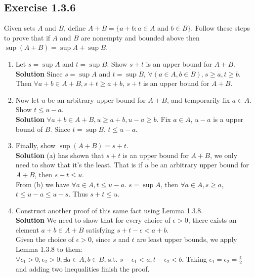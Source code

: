 \documentclass[12pt]{report}
\begin{document}
\subsection*{Exercise 1.3.6}
Given sets $A$ and $B$, define $A+B=\{a+b: a \in A$ and $b \in B\}$. Follow these steps to prove that if $A$ and $B$ are nonempty and bounded above then $\sup (A+B)=\sup A+\sup B$.
\begin{enumerate}[label=(\alph*)]
    \item Let $s=\sup A$ and $t=\sup B$. Show $s+t$ is an upper bound for $A+B$.
    \textbf{Solution} Since $s=\sup A$ and $t=\sup B$, $\forall (a \in A, b \in B), s \geq a, t \geq b$. Then $\forall a+b \in A+B, s+t \geq a+b$, $s+t$ is an upper bound for $A+B$.
    \item Now let $u$ be an arbitrary upper bound for $A+B$, and temporarily fix $a \in A$. Show $t \leq u-a$.\\
    \textbf{Solution} $\forall a+b \in A+B, u \geq a+b, u-a \geq b$. Fix $a\in A$, $u-a$ is a upper bound of $B$. Since $t=\sup B$, $t \leq u-a$.
    \item Finally, show $\sup (A+B)=s+t$.\\
    \textbf{Solution} (a) has shown that $s+t$ is an upper bound for $A+B$, we only need to show that it's the least. That is if $u$ be an arbitrary upper bound for $A+B$, then $s+t \leq u$.\\
    From (b) we have $\forall a \in A, t\leq u-a$. $s = \sup A$, then $\forall a\in A, s \geq a$, $t\leq u-a\leq u-s$. Thus $s+t \leq u$.
    \item Construct another proof of this same fact using Lemma 1.3.8.\\
    \textbf{Solution} We need to show that for every choice of $\epsilon >0$, there exists an element $a+b \in A+B$ satisfying $s+t-\epsilon <a+b$.\\
    Given the choice of $\epsilon >0$, since $s$ and $t$ are least upper bounds, we apply Lemma 1.3.8 to them:\\
    $\forall \epsilon_1 >0, \epsilon_2 >0, \exists a \in A, b \in B$, s.t. $s-\epsilon_1 < a, t-\epsilon_2 < b$. Taking $\epsilon_1 = \epsilon_2 = \frac{\epsilon}{2}$ and adding two inequalities finish the proof.
\end{enumerate}
\end{document}
